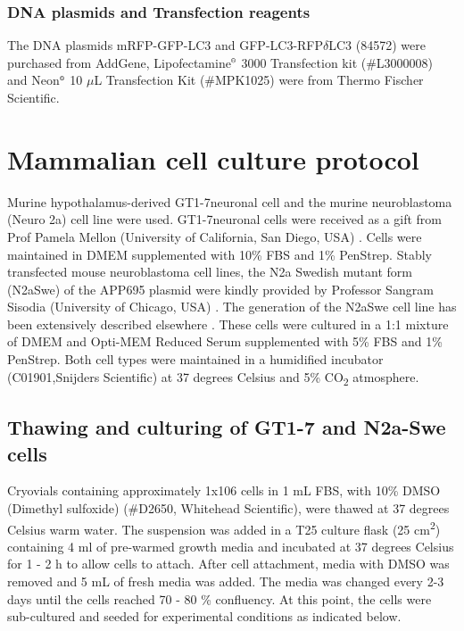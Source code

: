 \subsubsection{DNA plasmids and Transfection reagents}
The DNA plasmids mRFP-GFP-LC3 and GFP-LC3-RFP$\delta$LC3 (84572) were purchased from AddGene, Lipofectamine${\textsuperscript{\tiny{\textregistered}}}$ 3000 Transfection kit (\#L3000008) and Neon${\textsuperscript{\tiny{\textregistered}}}$ 10 $\mu$L Transfection Kit (\#MPK1025) were from Thermo Fischer Scientific.

\section{Mammalian cell culture protocol}
Murine hypothalamus-derived GT1-7neuronal cell and the murine neuroblastoma (Neuro 2a) cell line were used. GT1-7neuronal cells were received as a gift from Prof Pamela Mellon (University of California, San Diego, USA) \citep{Mellon1990}. Cells were maintained in DMEM supplemented with 10\% FBS and 1\% PenStrep. Stably transfected mouse neuroblastoma cell lines, the N2a Swedish mutant form (N2aSwe) of the APP695 plasmid were kindly provided by Professor Sangram Sisodia (University of Chicago, USA) \citep{Sisodia1990}. The generation of the N2aSwe cell line has been extensively described elsewhere \citep{Lo1994}. These cells were cultured in a 1:1 mixture of DMEM and Opti-MEM Reduced Serum supplemented with 5\% FBS and 1\% PenStrep. Both cell types were maintained in a humidified incubator (C01901,Snijders Scientific) at 37 degrees Celsius and 5\% CO\textsubscript{2} atmosphere.

\subsection{Thawing and culturing of GT1-7 and N2a-Swe cells}
Cryovials containing approximately 1x106 cells in 1 mL FBS, with 10\% DMSO (Dimethyl sulfoxide) (\#D2650, Whitehead Scientific), were thawed at 37 degrees Celsius warm water. The suspension was added in a T25 culture flask (25 cm\textsuperscript{2}) containing 4 ml of pre-warmed growth media and incubated at 37 degrees Celsius for 1 - 2 h to allow cells to attach. After cell attachment, media with DMSO was removed and 5 mL of fresh media was added. The media was changed every 2-3 days until the cells reached 70 - 80 \% confluency. At this point, the cells were sub-cultured and seeded for experimental conditions as indicated below.

